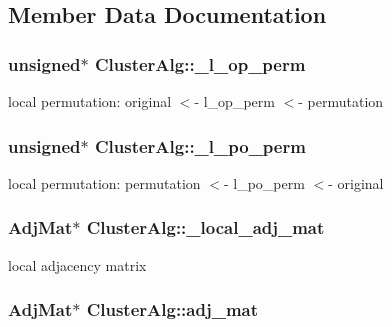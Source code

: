 \subsection{\-Member \-Data \-Documentation}
\hypertarget{classClusterAlg_a25fe84e1434812f52a484e14dc191a01}{
\subsubsection[{\-\_\-l\-\_\-op\-\_\-perm}]{\setlength{\rightskip}{0pt plus 5cm}unsigned$\ast$ {\bf \-Cluster\-Alg\-::\-\_\-l\-\_\-op\-\_\-perm}}}
\label{classClusterAlg_a25fe84e1434812f52a484e14dc191a01}
local permutation\-: original $<$-\/ l\-\_\-op\-\_\-perm $<$-\/ permutation \hypertarget{classClusterAlg_ae5aac25ca0791e244b25574814b18825}{
\subsubsection[{\-\_\-l\-\_\-po\-\_\-perm}]{\setlength{\rightskip}{0pt plus 5cm}unsigned$\ast$ {\bf \-Cluster\-Alg\-::\-\_\-l\-\_\-po\-\_\-perm}}}
\label{classClusterAlg_ae5aac25ca0791e244b25574814b18825}
local permutation\-: permutation $<$-\/ l\-\_\-po\-\_\-perm $<$-\/ original \hypertarget{classClusterAlg_aa7d43b82eac4084710cabafe6c9d8fee}{
\subsubsection[{\-\_\-local\-\_\-adj\-\_\-mat}]{\setlength{\rightskip}{0pt plus 5cm}\-Adj\-Mat$\ast$ {\bf \-Cluster\-Alg\-::\-\_\-local\-\_\-adj\-\_\-mat}}}
\label{classClusterAlg_aa7d43b82eac4084710cabafe6c9d8fee}
local adjacency matrix \hypertarget{classClusterAlg_a29eb1ed447fe956fbece857e0ab898bc}{
\subsubsection[{adj\-\_\-mat}]{\setlength{\rightskip}{0pt plus 5cm}\-Adj\-Mat$\ast$ {\bf \-Cluster\-Alg\-::adj\-\_\-mat}}}
